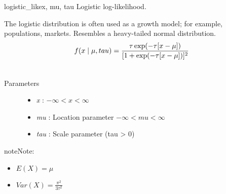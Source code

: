 \hypertarget{pymc.distributions.logistic_like}{}\begin{funcdesc}{logistic\_like}{x, mu, tau}
Logistic log-likelihood.

The logistic distribution is often used as a growth model; for example,
populations, markets. Resembles a heavy-tailed normal distribution.
\begin{gather}
\begin{split}f(x \mid \mu, tau) = \frac{\tau \exp(-\tau[x-\mu])}{[1 + \exp(-\tau[x-\mu])]^2}\end{split}\notag\\\begin{split}\end{split}\notag
\end{gather}\begin{description}
\item[Parameters] \leavevmode\begin{itemize}
\item {} 
\emph{x} : $-\infty < x < \infty$

\item {} 
\emph{mu} : Location parameter $-\infty < mu < \infty$

\item {} 
\emph{tau} : Scale parameter (tau \textgreater{} 0)

\end{itemize}

\end{description}

\begin{notice}{note}{Note:}\begin{itemize}
\item {} 
$E(X) = \mu$

\item {} 
$Var(X) = \frac{\pi^2}{3\tau^2}$

\end{itemize}
\end{notice}
\end{funcdesc}

